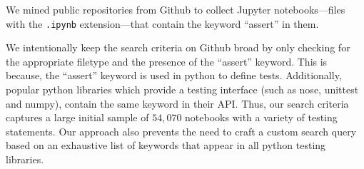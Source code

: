 \documentclass[acmsmall,screen,review,anonymous]{acmart}
\begin{document}
We mined public repositories from Github to collect Jupyter
notebooks---files with the \texttt{.ipynb} extension---that contain
the keyword ``assert'' in them.


We intentionally keep the search criteria on Github broad by only
checking for the appropriate filetype and the presence of the
``assert'' keyword. This is because, the ``assert'' keyword is used in
python to define tests. Additionally, popular python libraries which
provide a testing interface (such as nose, unittest and numpy),
contain the same keyword in their API. Thus, our search criteria
captures a large initial sample of $54,070$ notebooks with a variety
of testing statements. Our approach also prevents the need to craft a
custom search query based on an exhaustive list of keywords that
appear in all python testing libraries.
\end{document}
